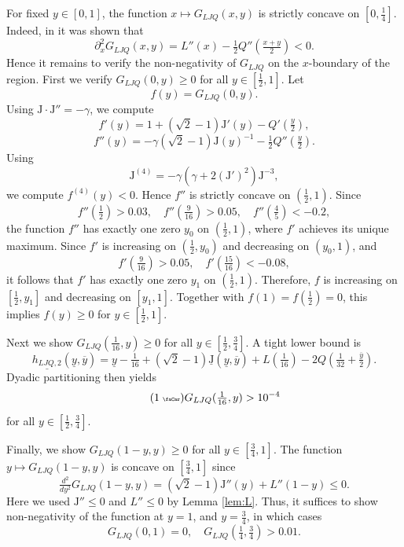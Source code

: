 \documentclass[11pt]{amsart}
\theoremstyle{plain}
\newcommand{\auto}{\tag{\addtocounter{equation}{1}\theequation\;{\tiny\faCar}}}
\theoremstyle{definition}
\theoremstyle{remark}
\numberwithin{equation}{section}
\begin{document}
For fixed
$y\in [0, 1]$, the function $x\mapsto G_{LJQ}(x,y)$ is strictly concave on $[0,\frac14]$.
Indeed, in \cite[Lemma 6.7]{DIR24} it was shown that
\begin{equation}\label{eqn:LJQlempf1}
\partial_x^2 G_{LJQ}(x,y) = L''(x) - \tfrac12 Q ''(\tfrac{x+y}2) <0.
\end{equation}
Hence it remains to verify the non-negativity of $G_{LJQ}$ on the $x$-boundary of the region. First we verify
$G_{LJQ}(0,y)\ge 0$ for all $y\in [\frac12,1]$. Let
\[ f(y)=G_{LJQ}(0,y).
\]
Using ${\mathrm{J}}\cdot{\mathrm{J}}''=-\gamma$, we compute
\[ f'(y) = 1 + (\sqrt{2}-1){\mathrm{J}}'(y) - Q'(\tfrac{y}2), \]
\[f''(y) = -\gamma (\sqrt{2}-1) {\mathrm{J}}(y)^{-1} -\tfrac12 Q''(\tfrac{y}2).\]
Using
\begin{equation}
\label{J_der4}
{\mathrm{J}}^{(4)} = -\gamma(\gamma+2({\mathrm{J}}')^2){\mathrm{J}}^{-3},
\end{equation}
we compute $f^{(4)}(y)<0$.
Hence $f''$ is strictly concave on $(\frac12,1)$. Since
\begin{equation}
f''(\tfrac{1}{2})>0.03,\quad f''(\tfrac{9}{16})>0.05,\quad
f''(\tfrac{4}{5})<-0.2,
\end{equation}
the function $f''$ has exactly one zero $y_0$ on $(\tfrac{1}{2},1)$, where $f'$
achieves its unique maximum.
Since $f'$ is increasing on $(\tfrac{1}{2},y_0)$ and decreasing on $(y_0,1)$, and
\[f'(\tfrac{9}{16})>0.05,\quad
f'(\tfrac{15}{16})<-0.08,\]
it follows that $f'$ has exactly one zero $y_1$ on $(\tfrac{1}{2},1)$. Therefore, $f$ is increasing on $[\frac12,y_1]$ and decreasing on $[y_1,1]$. Together with $f(1)=f(\tfrac{1}{2})=0$, this implies $f(y)\geq 0$ for $y\in [\frac12,1]$.

Next we show $G_{LJQ}(\tfrac1{16},y)\ge 0$ for all $y\in[\tfrac12,\tfrac34]$. A tight lower bound is
\[ \underline{h_{LJQ,2}}(\underline{y},\overline{y}) = \underline{y}-\tfrac{1}{16} + (\sqrt{2}-1) \underline{{\mathrm{J}}}(\underline{y},\overline{y}) +L(\tfrac{1}{16})-2Q(\tfrac{1}{32}+ \tfrac{\overline{y}}{2}).\]
Dyadic partitioning then yields
\begin{equation}\label{eqn:h_LJQ_2_auto}\auto
G_{LJQ}(\tfrac1{16},y)>10^{-4}
\end{equation}
for all $y\in [\frac12,\frac34]$.

Finally, we show $G_{LJQ}(1-y,y)\ge 0$ for all $y\in [\tfrac34,1]$.
The function $y\mapsto G_{LJQ}(1-y,y)$ is concave on $[\tfrac34,1]$ since
\[\tfrac{d^2}{dy^2}G_{LJQ}(1-y,y)= (\sqrt{2}-1) {\mathrm{J}}''(y)+L''(1-y)\le 0.\]
Here we used ${\mathrm{J}}''\leq 0$ and $L''\le 0$ by Lemma \ref{lem:L}.
Thus, it suffices to show non-negativity of the function at $y=1$, and $y=\tfrac{3}{4}$, in which cases
\[G_{LJQ}(0,1)=0,\quad G_{LJQ}(\tfrac{1}{4},\tfrac{3}{4})> 0.01.\]
\end{document}
